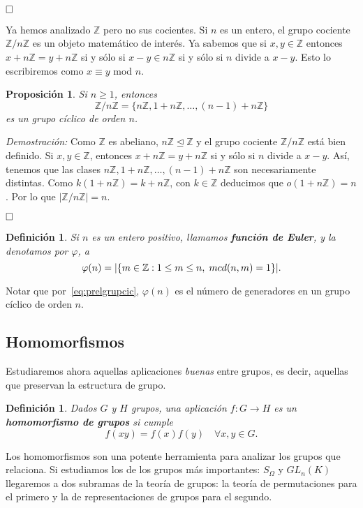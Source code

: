 \documentclass[12pt]{article}
\newtheorem{proposition}[theorem]{Proposición}
\newtheorem{definition}[theorem]{Definición}
\begin{document}
$\hfill \square$

Ya hemos analizado $\mathbb{Z}$ pero no sus cocientes. Si $n$ es un entero, el grupo cociente $\mathbb{Z}/n\mathbb{Z}$ es un objeto matemático de interés. Ya sabemos que si $x,y \in \mathbb{Z}$ entonces $x+n\mathbb{Z} = y + n\mathbb{Z}$ si y sólo si $x-y \in n\mathbb{Z}$ si y sólo si $n$ divide a $x-y$. Esto lo escribiremos como $x \equiv y$ mod $n$.

\begin{proposition}Si $n \geq 1$, entonces $$\mathbb{Z}/n\mathbb{Z} = \lbrace n\mathbb{Z}, 1+n\mathbb{Z}, \ldots, (n-1)+n\mathbb{Z} \rbrace$$ es un grupo cíclico de orden $n$.
\end{proposition}
\emph{Demostración: }Como $\mathbb{Z}$ es abeliano, $n\mathbb{Z} \unlhd \mathbb{Z}$ y el grupo cociente $\mathbb{Z}/n\mathbb{Z}$ está bien definido. Si $x,y \in \mathbb{Z}$, entonces $x +n\mathbb{Z} = y + n\mathbb{Z}$ si y sólo si $n$ divide a $x-y$. Así, tenemos que las clases $n\mathbb{Z}, 1+n\mathbb{Z}, \ldots, (n-1) +n\mathbb{Z}$ son necesariamente distintas. Como $k(1+n\mathbb{Z}) = k + n\mathbb{Z}$, con $k \in \mathbb{Z}$ deducimos que $o(1+n\mathbb{Z})=n$. Por lo que $|\mathbb{Z}/n\mathbb{Z}| = n$.

$\hfill \square$

\begin{definition}Si $n$ es un entero positivo, llamamos \textbf{función de Euler}, y la denotamos por $\varphi$, a $$\varphi(n)=| \lbrace m \in \mathbb{Z}:1\leq m \leq n, \hspace{0.1cm} mcd(n,m)=1 \rbrace|.$$
\end{definition}

Notar que por~\ref{eq:prelgrupcic}, $\varphi(n)$ es el número de generadores en un grupo cíclico de orden $n$.

\subsection{Homomorfismos}

Estudiaremos ahora aquellas aplicaciones \textit{buenas} entre grupos, es decir, aquellas que preservan la estructura de grupo.

\begin{definition}Dados $G$ y $H$ grupos, una aplicación $f \colon G \longrightarrow H$ es un \textbf{homomorfismo de grupos} si cumple $$f(xy) = f(x)f(y) \quad \forall x,y \in G.$$
\end{definition}

Los homomorfismos son una potente herramienta para analizar los grupos que relaciona. Si estudiamos los de los grupos más importantes: $S_{\Omega}$ y $GL_n(K)$ llegaremos a dos subramas de la teoría de grupos: la teoría de permutaciones para el primero y la de representaciones de grupos para el segundo.
\end{document}
